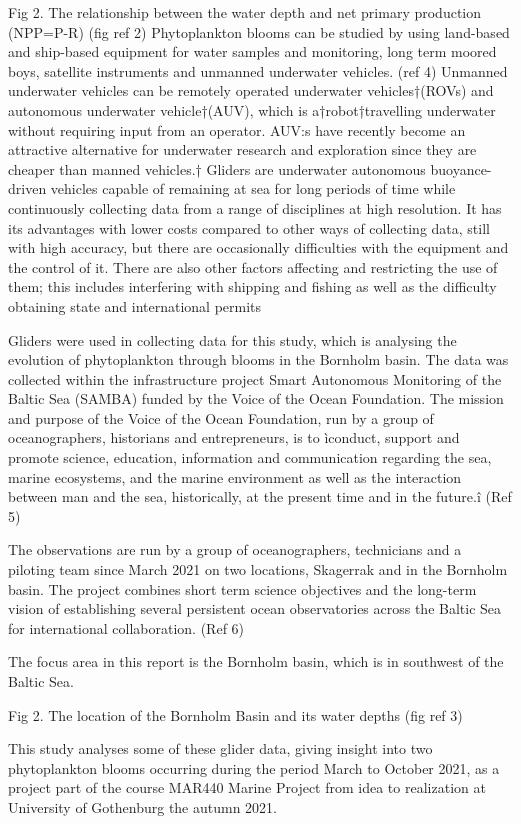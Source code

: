 \documentclass[../Main.tex]{subfiles}
\begin{document}
Fig 2. The relationship between the water depth and net primary production (NPP=P-R) (fig ref 2)
Phytoplankton blooms can be studied by using land-based and ship-based equipment for water samples and monitoring, long term moored boys, satellite instruments and unmanned underwater vehicles. (ref 4)
Unmanned underwater vehicles can be remotely operated underwater vehicles†(ROVs) and autonomous underwater vehicle†(AUV), which is a†robot†travelling underwater without requiring input from an operator.  AUV:s have recently become an attractive alternative for underwater research and exploration since they are cheaper than manned vehicles.† 
Gliders are underwater autonomous buoyance-driven vehicles capable of remaining at sea for long periods of time while continuously collecting data from a range of disciplines at high resolution. It has its advantages with lower costs compared to other ways of collecting data, still with high accuracy, but there are occasionally difficulties with the equipment and the control of it. There are also other factors affecting and restricting the use of them; this includes interfering with shipping and fishing as well as the difficulty obtaining state and international permits

Gliders were used in collecting data for this study, which is analysing the evolution of phytoplankton through blooms in the Bornholm basin. The data was collected within the infrastructure project Smart Autonomous Monitoring of the Baltic Sea (SAMBA) funded by the Voice of the Ocean Foundation. The mission and purpose of the Voice of the Ocean Foundation, run by a group of oceanographers, historians and entrepreneurs, is to ìconduct, support and promote science, education, information and communication regarding the sea, marine ecosystems, and the marine environment as well as the interaction between man and the sea, historically, at the present time and in the future.î  (Ref 5)

The observations are run by a group of oceanographers, technicians and a piloting team since March 2021 on two locations, Skagerrak and in the Bornholm basin. The project combines short term science objectives and the long-term vision of establishing several persistent ocean observatories across the Baltic Sea for international collaboration. (Ref 6)

The focus area in this report is the Bornholm basin, which is in southwest of the Baltic Sea. 



Fig 2. The location of the Bornholm Basin and its water depths (fig ref 3)

This study analyses some of these glider data, giving insight into two phytoplankton blooms occurring during the period March to October 2021, as a project part of the course MAR440 Marine Project from idea to realization at University of Gothenburg the autumn 2021.
\end{document}
